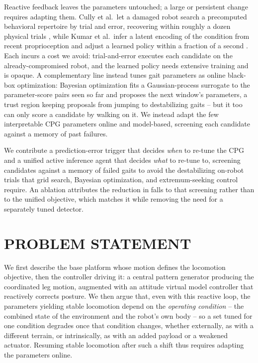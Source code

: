 \documentclass[letterpaper, 10 pt, conference]{ieeeconf}  %
\begin{document}
Reactive feedback leaves the parameters untouched; a large or persistent change requires adapting them. Cully et al.~let a damaged robot search a precomputed behavioral repertoire by trial and error, recovering within roughly a dozen physical trials \cite{cully2015robots}, while Kumar et al.~infer a latent encoding of the condition from recent proprioception and adjust a learned policy within a fraction of a second \cite{kumar2021rma}. Each incurs a cost we avoid: trial-and-error executes each candidate on the already-compromised robot, and the learned policy needs extensive training and is opaque. A complementary line instead tunes gait parameters as online black-box optimization: Bayesian optimization fits a Gaussian-process surrogate to the parameter-score pairs seen so far and proposes the next window's parameters, a trust region keeping proposals from jumping to destabilizing gaits \cite{eriksson2019scalable} -- but it too can only score a candidate by walking on it. We instead adapt the few interpretable CPG parameters online and model-based, screening each candidate against a memory of past failures.

We contribute a prediction-error trigger that decides \emph{when} to re-tune the CPG and a unified active inference agent that decides \emph{what} to re-tune to, screening candidates against a memory of failed gaits to avoid the destabilizing on-robot trials that grid search, Bayesian optimization, and extremum-seeking control require. An ablation attributes the reduction in falls to that screening rather than to the unified objective, which matches it while removing the need for a separately tuned detector.

\section{PROBLEM STATEMENT}

We first describe the base platform whose motion defines the locomotion objective, then the controller driving it: a central pattern generator producing the coordinated leg motion, augmented with an attitude virtual model controller that reactively corrects posture.
We then argue that, even with this reactive loop, the parameters yielding stable locomotion depend on the \emph{operating condition} -- the combined state of the environment and the robot's own body -- so a set tuned for one condition degrades once that condition changes, whether externally, as with a different terrain, or intrinsically, as with an added payload or a weakened actuator.
Resuming stable locomotion after such a shift thus requires adapting the parameters online.
\end{document}
